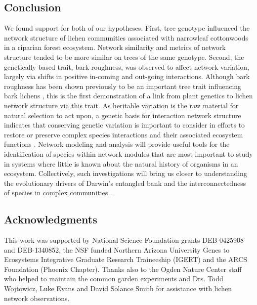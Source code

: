 \documentclass[fleqn,12pt]{olplainarticle}
\begin{document}
\subsection*{Conclusion}

We found support for both of our hypotheses. First, tree genotype
influenced the network structure of lichen communities associated with
narrowleaf cottonwoods in a riparian forest ecosystem. Network
similarity and metrics of network structure tended to be more similar
on trees of the same genotype. Second, the genetically based trait,
bark roughness, was observed to affect network variation, largely via
shifts in positive in-coming and out-going interactions. Although bark
roughness has been shown previously to be an important tree trait
influencing bark lichens \citep{Lamit2015a}, this is the first
demonstration of a link from plant genetics to lichen network
structure via this trait. As heritable variation is the raw material
for natural selection to act upon, a genetic basis for interaction
network structure indicates that conserving genetic variation is
important to consider in efforts to restore or preserve complex
species interactions and their associated ecosystem functions \citep{
  Whitham2012afix, Evans2013, Barraclough2015,
  Whitham2020IntraspecificEvolution}. Network modeling and analysis
will provide useful tools for the identification of species within
network modules that are most important to study in systems where
little is known about the natural history of organisms in an
ecosystem. Collectively, such investigations will bring us closer to
understanding the evolutionary drivers of Darwin's entangled bank and
the interconnectedness of species in complex communities
\citep{Darwin1859, Dattilo2016fix}.



\subsection*{Acknowledgments}

This work was supported by National Science Foundation grants
DEB-0425908 and DEB-1340852, the NSF funded Northern Arizona
University Genes to Ecosystems Integrative Graduate Research
Traineeship (IGERT) and the ARCS Foundation (Phoenix Chapter). Thanks
also to the Ogden Nature Center staff who helped to maintain the
common garden experiments and Drs. Todd Wojtowicz, Luke Evans and
David Solance Smith for assistance with lichen network observations.

\end{document}
